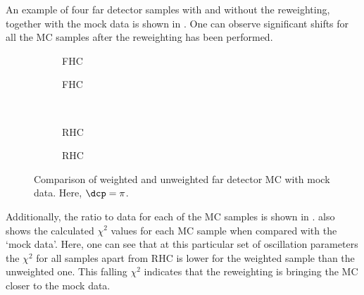 An example of four far detector samples with and without the reweighting, together with the mock data is shown in .
One can observe significant shifts for all the MC samples after the reweighting has been performed.

\begin{figure}[h]
	\begin{subfigure}[t]{.5\linewidth}
		\begin{adjustbox}{max totalsize=\linewidth, center}
			
		\end{adjustbox}
		\caption{FHC \numu}
	\end{subfigure}
	\hfill
	\begin{subfigure}[t]{.5\linewidth}
		\begin{adjustbox}{max totalsize=\linewidth, center}
			
		\end{adjustbox}
		\caption{FHC \nue}
	\end{subfigure} \\
	\begin{subfigure}[t]{.5\linewidth}
		\begin{adjustbox}{max totalsize=\linewidth, center}
			
		\end{adjustbox}
		\caption{RHC \anumu}
	\end{subfigure}
	\hfill
	\begin{subfigure}[t]{.5\linewidth}
		\begin{adjustbox}{max totalsize=\linewidth, center}
			
		\end{adjustbox}
		\caption{RHC \anue}
	\end{subfigure}
	\caption[Comparison of weighted and unweighted far detector MC with mock data]{Comparison of weighted and unweighted far detector MC with mock data. Here, $\dcp=\pi$.}
	\label{fig:reweightedSamples}
\end{figure}

Additionally, the ratio to data for each of the MC samples is shown in .
 also shows the calculated $\chi^{2}$ values for each MC sample when compared with the `mock data'.
Here, one can see that at this particular set of oscillation parameters the $\chi^{2}$ for all samples apart from \nue RHC is lower for the weighted sample than the unweighted one.
This falling $\chi^{2}$ indicates that the reweighting is bringing the MC closer to the mock data.


